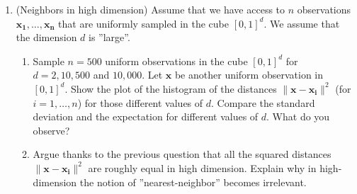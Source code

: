 \documentclass[12pt]{article}
\renewcommand{\b}[1]{\mathbf{#1 }}
\newcommand{\E}{\mathbb{E}}
\begin{document}
\begin{enumerate}
\item (Neighbors in high dimension) %
Assume that we have access to $n$ observations $\b{x_1},\dots,\b{x_n}$ that are uniformly sampled in the cube $[0,1]^d$. We assume that the dimension $d$ is ''large''. 
\begin{enumerate}
\item  Sample $n=500$ uniform observations in the cube $[0,1]^d$ for $d=2, 10, 500$ and $10,000$. Let $\b{x}$ be another uniform observation in $[0,1]^d$. Show the plot of the histogram of the distances $\|\b{x}-\b{x_i}\|^2$ (for $i=1,\dots,n$) for those different values of $d$. Compare the standard deviation and the expectation for different values of $d$. What do you observe?
\item %
Argue thanks to the previous question that all the squared distances $\|\b{x}-\b{x_i}\|^2$ are roughly equal in high dimension. Explain why in high-dimension the notion of ''nearest-neighbor'' becomes irrelevant.%
\end{enumerate}

\end{enumerate}
\end{document}
